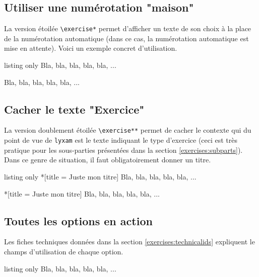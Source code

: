 \documentclass[12pt,a4paper]{scrartcl}
\begin{document}
    \subsection{Utiliser une numérotation "maison"}

La version étoilée \verb+\exercise*+ permet d'afficher un texte de son choix à la place de la numérotation automatique (dans ce cas, la numérotation automatique est mise en attente). Voici un exemple concret d'utilisation.

\begin{tcblisting}{listing only}
\exercise*[id = facultatif]
Bla, bla, bla, bla, bla, ...
\end{tcblisting}

\examplestart{}
\exercise*[id = facultatif]
Bla, bla, bla, bla, bla, ...
\exampleend{}



    \subsection{Cacher le texte "Exercice"}

La version doublement étoilée \verb+\exercise**+ permet de cacher le contexte qui du point de vue de \verb+lyxam+ est le texte indiquant le type d'exercice (ceci est très pratique pour les sous-parties présentées dans la section \ref{exercises:subparts}). Dans ce genre de situation, il faut obligatoirement donner un titre.

\begin{tcblisting}{listing only}
\exercise**[title = Juste mon titre]
Bla, bla, bla, bla, bla, ...
\end{tcblisting}

\examplestart{}
\exercise**[title = Juste mon titre]
Bla, bla, bla, bla, bla, ...
\exampleend{}


    \subsection{Toutes les options en action}

Les fiches techniques données dans la section \ref{exercises:technicalids} expliquent le champs d'utilisation de chaque option.

\begin{tcblisting}{listing only}
\exercise*[id    = facultatif,
           title = Devinette,
           pts   = 0,
           time  = 3 jours,
           about = Pour spécialiste uniquement,
           src   = Le livre des experts]
Bla, bla, bla, bla, bla, ...
\end{tcblisting}
\end{document}
